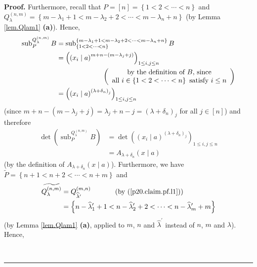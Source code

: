 \documentclass[numbers=enddot,12pt,final,onecolumn,notitlepage]{scrartcl}%
\theoremstyle{definition}
\newenvironment{proof}[1][Proof]{\noindent\textbf{#1.} }{\ \rule{0.5em}{0.5em}}
\begin{document}
\begin{enumerate}
\begin{proof}
Furthermore, recall that $P=\left[  n\right]  =\left\{  1<2<\cdots<n\right\}
$ and \newline$Q_{\lambda}^{\left(  n,m\right)  }=\left\{  m-\lambda
_{1}+1<m-\lambda_{2}+2<\cdots<m-\lambda_{n}+n\right\}  $ (by Lemma
\ref{lem.Qlam1} \textbf{(a)}). Hence,%
\begin{align*}
\operatorname*{sub}\nolimits_{P}^{Q_{\lambda}^{\left(  n,m\right)  }}B  &
=\operatorname*{sub}\nolimits_{\left\{  1<2<\cdots<n\right\}  }^{\left\{
m-\lambda_{1}+1<m-\lambda_{2}+2<\cdots<m-\lambda_{n}+n\right\}  }B\\
&  =\left(  \left(  x_{i}\mid a\right)  ^{m+n-\left(  m-\lambda_{j}+j\right)
}\right)  _{1\leq i,j\leq n}\\
&  \ \ \ \ \ \ \ \ \ \ \ \ \ \ \ \ \ \ \ \ \left(
\begin{array}
[c]{c}%
\text{by the definition of }B\text{, since}\\
\text{all }i\in\left\{  1<2<\cdots<n\right\}  \text{ satisfy }i\leq n
\end{array}
\right) \\
&  =\left(  \left(  x_{i}\mid a\right)  ^{\left(  \lambda+\delta_{n}\right)
_{j}}\right)  _{1\leq i,j\leq n}%
\end{align*}
(since $m+n-\left(  m-\lambda_{j}+j\right)  =\lambda_{j}+n-j=\left(
\lambda+\delta_{n}\right)  _{j}$ for all $j\in\left[  n\right]  $) and
therefore%
\begin{align}
\det\left(  \operatorname*{sub}\nolimits_{P}^{Q_{\lambda}^{\left(  n,m\right)
}}B\right)   &  =\det\left(  \left(  x_{i}\mid a\right)  ^{\left(
\lambda+\delta_{n}\right)  _{j}}\right)  _{1\leq i,j\leq n}\nonumber\\
&  =A_{\lambda+\delta_{n}}\left(  x\mid a\right)  \label{p20.claim.pf.l2}%
\end{align}
(by the definition of $A_{\lambda+\delta_{n}}\left(  x\mid a\right)  $).
Furthermore, we have \newline$\widetilde{P}=\left\{  n+1<n+2<\cdots
<n+m\right\}  $ and%
\begin{align*}
\widetilde{Q_{\lambda}^{\left(  n,m\right)  }}  &  =Q_{\widehat{\lambda
}^{\prime}}^{\left(  m,n\right)  }\ \ \ \ \ \ \ \ \ \ \left(  \text{by
(\ref{p20.claim.pf.l1})}\right) \\
&  =\left\{  n-\widehat{\lambda}_{1}^{\prime}+1<n-\widehat{\lambda}%
_{2}^{\prime}+2<\cdots<n-\widehat{\lambda}_{m}^{\prime}+m\right\}
\end{align*}
(by Lemma \ref{lem.Qlam1} \textbf{(a)}, applied to $m$, $n$ and
$\widehat{\lambda}^{\prime}$ instead of $n$, $m$ and $\lambda$). Hence,%

\end{proof}
\end{enumerate}
\end{document}
